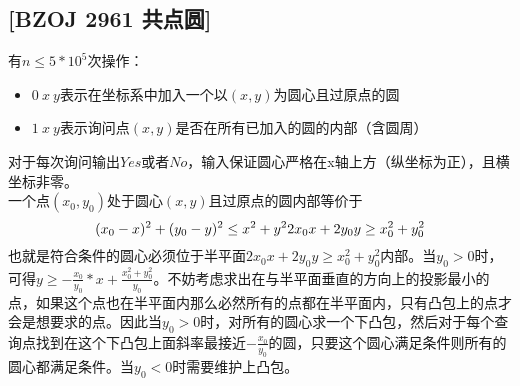 \subsection{[BZOJ 2961 共点圆]}
有$n\leq 5*10^5$次操作：
\begin{itemize}
\item $0\ x\ y$表示在坐标系中加入一个以$(x, y)$为圆心且过原点的圆
\item $1\ x\ y$表示询问点$(x,y)$是否在所有已加入的圆的内部（含圆周）
\end{itemize}
对于每次询问输出$Yes$或者$No$，输入保证圆心严格在x轴上方（纵坐标为正），且横坐标非零。\\

一个点$(x_0,y_0)$处于圆心$(x,y)$且过原点的圆内部等价于
$$
(x_0-x)^2+(y_0-y)^2\leq x^2+y^2 \\
2x_0x+2y_{0}y\geq x_{0}^2+y_{0}^2
$$
也就是符合条件的圆心必须位于半平面$2x_0x+2y_0y\geq x_{0}^2+y_{0}^2$内部。当$y_{0}>0$时，可得$y\geq -\frac{x_0}{y_0}*x+\frac{x_{0}^2+y_{0}^2}{y_0}$。不妨考虑求出在与半平面垂直的方向上的投影最小的点，如果这个点也在半平面内那么必然所有的点都在半平面内，只有凸包上的点才会是想要求的点。因此当$y_0>0$时，对所有的圆心求一个下凸包，然后对于每个查询点找到在这个下凸包上面斜率最接近$-\frac{x_0}{y_0}$的圆，只要这个圆心满足条件则所有的圆心都满足条件。当$y_0 <  0$时需要维护上凸包。
